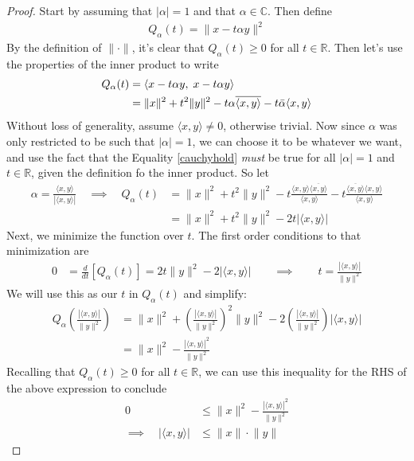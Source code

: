 \documentclass[12pt]{article}
\numberwithin{equation}{section} %
\theoremstyle{plain}
\theoremstyle{definition}
\theoremstyle{remark}
\newcommand{\R}{\mathbb{R}}
\begin{document}
\begin{proof}
Start by assuming that $|\alpha|=1$ and that $\alpha\in\mathbb{C}$. Then
define
\begin{align*}
  Q_\alpha(t) = \lVert x - t\alpha y\rVert^2
\end{align*}
By the definition of $\lVert \cdot\rVert$, it's clear that
$Q_\alpha(t)\geq 0$ for all $t\in\mathbb{R}$. Then let's use the
properties of the inner product to write
\begin{align}
    Q_\alpha(t) &= \langle x -t\alpha y,\; x -t\alpha y\rangle \notag \\
    &= \lVert x\rVert^2 + t^2 \lVert y\rVert^2
    - t\alpha \overline{\langle x,y\rangle}
    - t\bar{\alpha} {\langle x,y\rangle} \label{cauchyhold}
\end{align}
Without loss of generality, assume $\langle x,y\rangle\neq 0$, otherwise
trivial. Now since $\alpha$ was only restricted to be such that
$|\alpha|=1$, we can choose it to be whatever we want, and use the fact
that the Equality \ref{cauchyhold} \emph{must} be true for all
$|\alpha|=1$ and $t\in\mathbb{R}$, given the definition fo the inner
product. So let
\begin{align*}
    \alpha = \frac{\langle x,y\rangle}{|\langle x,y\rangle|}
    \quad\implies\quad
    Q_\alpha(t) &= \lVert x\rVert^2 + t^2 \lVert y\rVert^2
    - t\frac{\langle x,y\rangle\overline{\langle x,y\rangle}}{\langle x,y\rangle}
    - t\frac{\overline{\langle x,y\rangle}{\langle x,y\rangle}}{\langle x,y\rangle}  \\
    &= \lVert x\rVert^2 + t^2 \lVert y\rVert^2
    -2t |\langle x,y\rangle|
\end{align*}
Next, we minimize the function over $t$. The first order conditions to
that minimization are
\begin{align*}
  0 &= \frac{d}{dt}[Q_\alpha(t)]
    = 2t \lVert y\rVert^2 -2 |\langle x,y\rangle|
  \qquad\implies\qquad
  t = \frac{|\langle x,y\rangle|}{\lVert y\rVert^2}
\end{align*}
We will use this as our $t$ in $Q_\alpha(t)$ and simplify:
\begin{align*}
  Q_\alpha\left(
  \frac{|\langle x,y\rangle|}{\lVert y\rVert^2}
  \right)
  &= \lVert x\rVert^2 +
  \left(\frac{|\langle x,y\rangle|}{\lVert y\rVert^2}\right)^2
  \lVert y\rVert^2
  -2
  \left(\frac{|\langle x,y\rangle|}{\lVert y\rVert^2}\right)
  |\langle x,y\rangle| \\
  &= \lVert x\rVert^2
  - \frac{|\langle x,y\rangle|^2}{\lVert y\rVert^2}
\end{align*}
Recalling that $Q_\alpha(t)\geq 0$ for all $t\in\R$, we can use this
inequality for the RHS of the above expression to conclude
\begin{align*}
  0 &\leq
   \lVert x\rVert^2
  - \frac{|\langle x,y\rangle|^2}{\lVert y\rVert^2} \\
  \implies\quad
  |\langle x,y\rangle| &\leq
   \lVert x\rVert \cdot \lVert y\rVert
\end{align*}
\end{proof}
\end{document}
